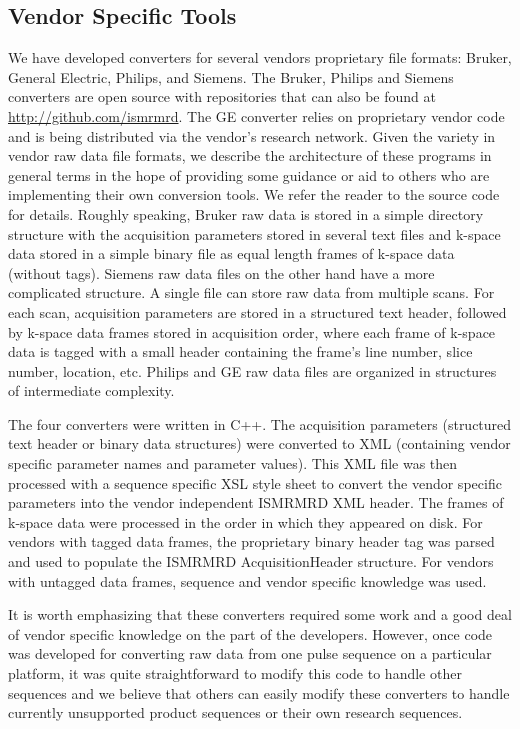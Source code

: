 \documentclass[12pt]{article}
\begin{document}
\subsection*{Vendor Specific Tools}
We have developed converters for several vendors proprietary file formats: Bruker, General Electric, Philips, and Siemens.  The Bruker, Philips and Siemens converters are open source with repositories that can also be found at \url{http://github.com/ismrmrd}.  The GE converter relies on proprietary vendor code and is being distributed via the vendor's research network.  Given the variety in vendor raw data file formats, we  describe the architecture of these programs in general terms in the hope of providing some guidance or aid to others who are implementing their own conversion tools.  We refer the reader to the source code for  details.  Roughly speaking, Bruker raw data is stored in a simple directory structure with the acquisition parameters stored in several text files and k-space data stored in a simple binary file as equal length frames of k-space data (without tags).  Siemens raw data files on the other hand have a more complicated structure.  A single file can store raw data from multiple scans.  For each scan, acquisition parameters are stored in a structured text header, followed by k-space data frames stored in acquisition order, where each frame of k-space data is tagged with a small header containing the frame's line number, slice number, location, etc.  Philips and GE raw data files are organized in structures of intermediate complexity.

The four converters were written in C++.  The acquisition parameters (structured text header or binary data structures) were converted to XML (containing vendor specific parameter names and parameter values).  This XML file was then processed with a sequence specific XSL style sheet to convert the vendor specific parameters into the vendor independent ISMRMRD XML header.  The frames of k-space data were processed in the order in which they appeared on disk.  For vendors with tagged data frames, the proprietary binary header tag was parsed and used to populate the ISMRMRD AcquisitionHeader structure.  For vendors with untagged data frames, sequence and vendor specific knowledge was used.  

It is worth emphasizing that these converters required some work and a good deal of vendor specific knowledge on the part of the developers.  However, once code was developed for converting raw data from one pulse sequence on a particular platform, it was quite straightforward to modify this code to handle other sequences and we believe that others can easily modify these converters to handle currently unsupported product sequences or their own research sequences.
\end{document}
